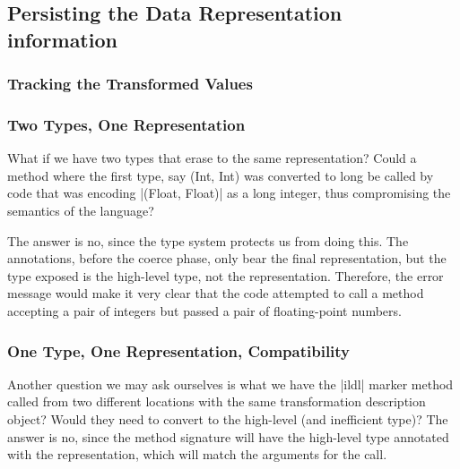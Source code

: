 
\subsection{Persisting the Data Representation information}
\label{sec:ildl:signatures}



\subsubsection{Tracking the Transformed Values}

\subsubsection{Two Types, One Representation}

What if we have two types that erase to the same representation? Could a method where the first type, say (Int, Int) was converted to long be called by code that was encoding |(Float, Float)| as a long integer, thus compromising the semantics of the language?

The answer is no, since the type system protects us from doing this. The annotations, before the coerce phase, only bear the final representation, but the type exposed is the high-level type, not the representation. Therefore, the error message would make it very clear that the code attempted to call a method accepting a pair of integers but passed a pair of floating-point numbers.

\subsubsection{One Type, One Representation, Compatibility}

Another question we may ask ourselves is what we have the |ildl| marker method called from two different locations with the same transformation description object? Would they need to convert to the high-level (and inefficient type)? The answer is no, since the method signature will have the high-level type annotated with the representation, which will match the arguments for the call.


